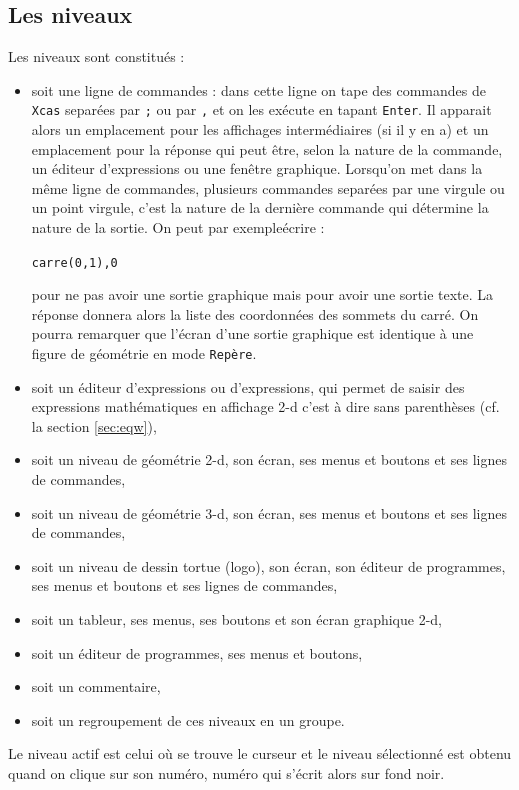 \documentclass[a4paper,11pt]{article}
\begin{document}
\subsection{Les niveaux}
Les niveaux sont constitu\'es :
\begin{itemize}
\item soit une ligne de commandes : dans cette ligne on tape des commandes de 
{\tt Xcas} separ\'ees par {\tt ;} ou par {\tt ,} et on les ex\'ecute en tapant 
{\tt Enter}. Il apparait alors un emplacement pour les affichages 
interm\'ediaires (si il y en a) 
et un emplacement pour la r\'eponse qui peut \^etre, selon la nature de la 
commande, un \'editeur d'expressions ou une fen\^etre graphique. 
Lorsqu'on met dans la m\^eme ligne de commandes, plusieurs commandes separ\'ees
par une virgule ou un point virgule, c'est la nature de la derni\`ere commande 
qui d\'etermine la nature de la sortie. On peut par exemple\'ecrire :
\begin{center}{\tt carre(0,1),0}\end{center} 
pour ne pas avoir une sortie graphique mais pour avoir une sortie texte. La 
r\'eponse donnera alors la liste des coordonn\'ees des sommets du carr\'e.
On pourra remarquer que l'\'ecran d'une sortie graphique est identique \`a une 
figure de g\'eom\'etrie en mode {\tt Rep\`ere}.
\item soit un \'editeur d'expressions ou d'expressions, qui permet de saisir 
des expressions math\'ematiques en affichage 2-d c'est \`a dire sans 
parenth\`eses (cf. la section \ref{sec:eqw}),
\item soit un niveau de g\'eom\'etrie 2-d, son \'ecran, ses menus et boutons 
et ses lignes de  commandes,
\item soit un niveau de g\'eom\'etrie 3-d, son \'ecran, ses menus et boutons 
et ses lignes de commandes,
\item soit un niveau de dessin tortue (logo), son \'ecran, son \'editeur de 
programmes, ses menus et boutons et ses lignes de commandes,
\item soit un tableur, ses menus, ses boutons et son \'ecran graphique 2-d,
\item soit un \'editeur de programmes, ses menus et boutons,
\item soit un commentaire,
\item soit un regroupement de ces niveaux en un groupe.
\end{itemize}
Le niveau actif est celui o\`u se trouve le curseur et le niveau 
s\'electionn\'e est obtenu quand on clique sur son num\'ero, num\'ero qui 
s'\'ecrit alors sur fond noir.
\end{document}
